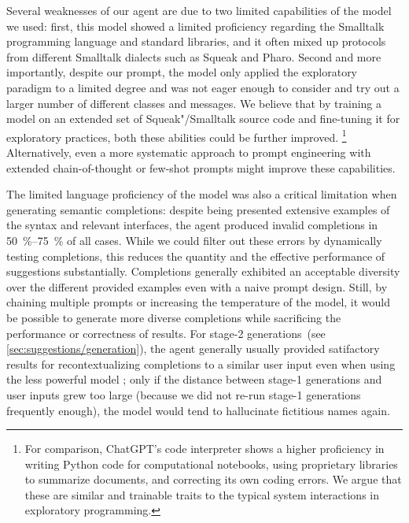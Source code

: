 Several weaknesses of our agent are due to two limited capabilities of the \gptfouro model we used:
first, this model showed a limited proficiency regarding the Smalltalk programming language and standard libraries, and it often mixed up protocols from different Smalltalk dialects such as Squeak and Pharo.
Second and more importantly, despite our prompt, the model only applied the exploratory paradigm to a limited degree and was not eager enough to consider and try out a larger number of different classes and messages.
We believe that by training a model on an extended set of Squeak"/Smalltalk source code and fine-tuning it for exploratory practices, both these abilities could be further improved.%
\footnote{
	For comparison, ChatGPT's code interpreter shows a higher proficiency in writing Python code for computational notebooks, using proprietary libraries to summarize documents, and correcting its own coding errors.
	We argue that these are similar and trainable traits to the typical system interactions in exploratory programming.
}
Alternatively, even a more systematic approach to prompt engineering with extended chain-of-thought or few-shot prompts might improve these capabilities.

The limited language proficiency of the model was also a critical limitation when generating semantic completions:
despite being presented extensive examples of the syntax and relevant interfaces, the agent produced invalid completions in \qty{50}{\percent}--\qty{75}{\percent} of all cases.
While we could filter out these errors by dynamically testing completions, this reduces the quantity and the effective performance of suggestions substantially.
Completions generally exhibited an acceptable diversity over the different provided examples even with a naive prompt design.
Still, by chaining multiple prompts or increasing the temperature of the model, it would be possible to generate more diverse completions while sacrificing the performance or correctness of results.
For stage-2 generations~(see \cref{sec:suggestions/generation}), the agent generally usually provided satifactory results for recontextualizing completions to a similar user input even when using the less powerful model \gptfouromini; only if the distance between stage-1 generations and user inputs grew too large (because we did not re-run stage-1 generations frequently enough), the model would tend to hallucinate fictitious names again.
